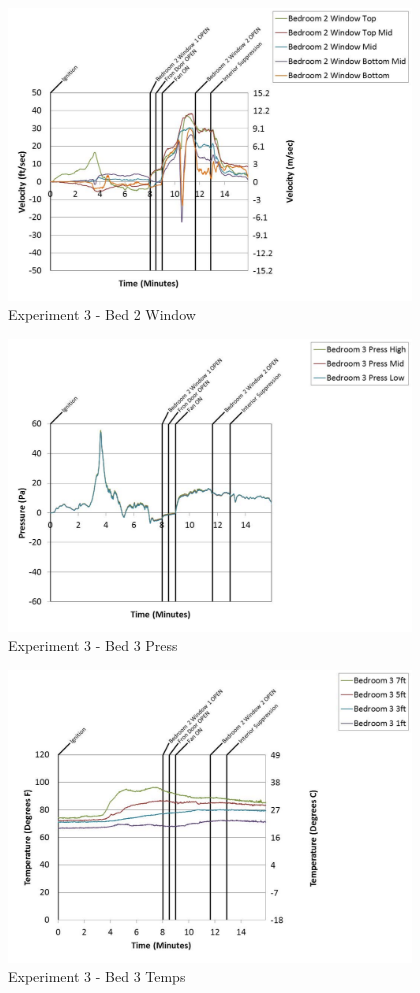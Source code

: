 \documentclass{article}
\begin{document}
\begin{appendices}
	\begin{figure}[h!]
		\centering
		\includegraphics[height=3.05in]{0_Images/Results_Charts/Exp_3_Charts/Bed2Window.pdf}
		\caption{Experiment 3 - Bed 2 Window}
	\end{figure}
 
	\clearpage

	\begin{figure}[h!]
		\centering
		\includegraphics[height=3.05in]{0_Images/Results_Charts/Exp_3_Charts/Bed3Press.pdf}
		\caption{Experiment 3 - Bed 3 Press}
	\end{figure}
 

	\begin{figure}[h!]
		\centering
		\includegraphics[height=3.05in]{0_Images/Results_Charts/Exp_3_Charts/Bed3Temps.pdf}
		\caption{Experiment 3 - Bed 3 Temps}
	\end{figure}
 

\end{appendices}
\end{document}
